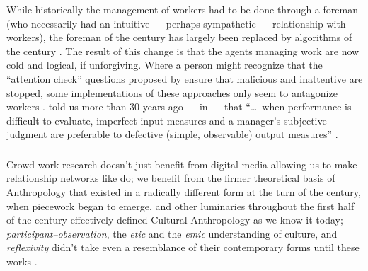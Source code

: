 \documentclass[trackingWork]{subfiles}
\begin{document}
While historically the management of workers had to be done through a foreman
(who necessarily had an intuitive
--- perhaps sympathetic ---
relationship with workers),
the foreman of the  century has largely been replaced
by algorithms of the  century
\cite{uberAlgorithm}.
The result of this change is that the agents managing work are now
cold and logical, if unforgiving.
Where a person might recognize that the ``attention check'' questions 
proposed by \citeauthor{le2010ensuring} ensure that malicious and inattentive are stopped,
some implementations of these approaches
only seem to antagonize workers 
\cite{le2010ensuring,MaliciousCrowdworkersGadiraju}.
\citeauthor{10.2307/2555446} told us more than 30 years ago
--- in \citeyear{10.2307/2555446} --- that
``\dots~when performance is difficult to evaluate,
imperfect input measures and
a manager's subjective judgment are preferable to
defective (simple, observable) output measures''
\cite{10.2307/2555446}.


\subsubsection{\implication}
Crowd work research doesn't just benefit from
digital media allowing us to make
relationship networks like \citeauthor{crowdcollab} do;
we benefit from the firmer theoretical basis of Anthropology that
existed in a radically different form at the turn of the  century,
when piecework began to emerge.
\citeauthor{malinowski2002argonauts,boas1940race,mead1973coming} and
other luminaries throughout the first half of the  century
effectively defined Cultural Anthropology as we know it today;
\textit{participant--observation},
the \textit{etic} and the \textit{emic} understanding of culture, and
\textit{reflexivity}
didn't take even a resemblance of their contemporary forms until these works
\cite{malinowski2002argonauts,boas1940race,mead1973coming}.
\end{document}
